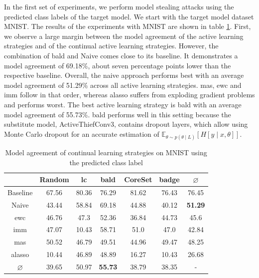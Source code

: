 In the first set of experiments, we perform model stealing attacks using the predicted class labels of the target model. We start with the target model dataset MNIST. 
The results of the experiments with MNIST are shown in table \ref{fig:ModelStealingMNISTLabel}. First, we observe a large margin between the model agreement
of the active learning strategies and of the continual active learning strategies. However, the combination of \gls{bald} and Naive comes close to
its baseline. It demonstrates a model agreement of 69.18\%, about seven percentage points lower than the respective baseline. Overall, the naive approach performs
best with an average model agreement of 51.29\% across all active learning strategies. \gls{mas}, \gls{ewc} and \gls{imm} follow in that order, whereas \gls{alasso} 
suffers from exploding gradient problems and performs worst. The best active learning strategy is \gls{bald} with an average model agreement of 55.73\%. \gls{bald}
performs well in this setting because the substitute model, ActiveThiefConv3, contains dropout layers, which allow using Monte Carlo dropout for an accurate estimation
of $\mathbb{E}_{\theta \sim p(\theta \mid L)} [H[y \mid x, \theta]]$. \par

\begin{table}[h]
    \centering
    \begin{tabular}{c | c c c c c | c } 
         & Random & \gls{lc} & \gls{bald} & CoreSet & \gls{badge} & $\varnothing$ \\ 
        \hline
        Baseline & 67.56 & 80.36 & 76.29 & 81.62 & 76.43 & 76.45\\
        \hline
        Naive & 43.44 & 58.84 & 69.18 & 44.88 & 40.12 & \textbf{51.29}\\
        \gls{ewc} &  46.76 & 47.3 & 52.36 & 36.84 & 44.73 & 45.6\\
        \gls{imm} & 47.07 & 10.43 & 58.71 & 51.0 & 47.0 & 42.84\\
        \gls{mas} & 50.52 & 46.79 & 49.51 & 44.96 & 49.47 & 48.25\\
        \gls{alasso} & 10.44 & 46.89 & 48.89 & 16.27 & 10.43 & 26.68\\
        \hline
        $\varnothing$ & 39.65 & 50.97 & \textbf{55.73} & 38.79 & 38.35 & -\\
    \end{tabular}
    \caption{Model agreement of continual learning strategies on MNIST using the predicted class label}
    \label{fig:ModelStealingMNISTLabel}
\end{table}



